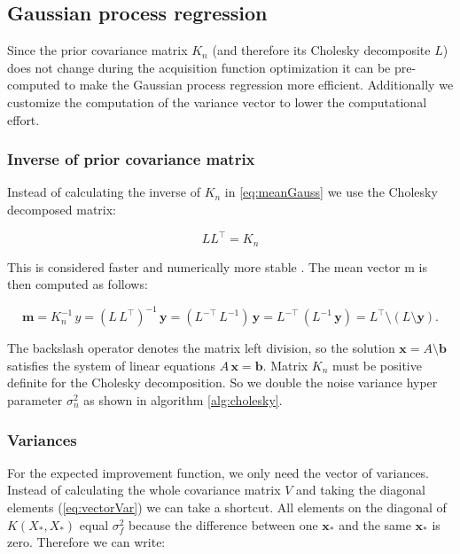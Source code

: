 \subsection{Gaussian process regression}

Since the prior covariance matrix $K_n$ (and therefore its Cholesky decomposite $L$) does not change during the acquisition function optimization it can be pre-computed to make the Gaussian process regression more efficient. Additionally we customize the computation of the variance vector to lower the computational effort.

\subsubsection{Inverse of prior covariance matrix}

Instead of calculating the inverse of $K_n$ in \eqref{eq:meanGauss} we use the Cholesky decomposed matrix:

$$LL^\top=K_n$$

This is considered faster and numerically more stable \cite{rasmussen2006gaussian}. The mean vector $\mathrm{m}$ is then computed as follows:

\begin{equation} \label{eq:regression}
    \mathbf{m} = K_n^{-1}\,y = (L\,L^{\top})^{-1}\,\mathbf{y} = (L^{-\top}\,L^{-1})\,\mathbf{y} = L^{-\top}\,(L^{-1}\,\mathbf{y}) = L^{\top}\setminus(L \setminus \mathbf{y}).
\end{equation}

The backslash operator denotes the matrix left division, so the solution $\mathbf{x}=A\setminus \mathbf{b}$ satisfies the system of linear equations $A\,\mathbf{x}=\mathbf{b}$.
Matrix $K_n$ must be positive definite for the Cholesky decomposition. So we double the noise variance hyper parameter $\sigma_n^2$ as shown in algorithm \ref{alg:cholesky}.

\subsubsection{Variances}

For the expected improvement function, we only need the vector of variances. Instead of calculating the whole covariance matrix $V$ and taking the diagonal elements (\ref{eq:vectorVar}) we can take a shortcut. All elements on the diagonal of $K(X_*,X_*)$ equal $\sigma_f^2$ because the difference between one $\mathbf{x}_*$ and the same $\mathbf{x}_*$ is zero. Therefore we can write:


